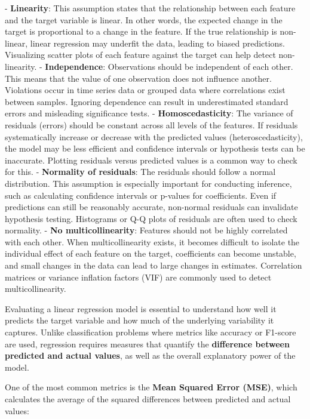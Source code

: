 - \textbf{Linearity}: This assumption states that the relationship between each feature and the target variable is linear. In other words, the expected change in the target is proportional to a change in the feature. If the true relationship is non-linear, linear regression may underfit the data, leading to biased predictions. Visualizing scatter plots of each feature against the target can help detect non-linearity. 
- \textbf{Independence}: Observations should be independent of each other. This means that the value of one observation does not influence another. Violations occur in time series data or grouped data where correlations exist between samples. Ignoring dependence can result in underestimated standard errors and misleading significance tests. 
- \textbf{Homoscedasticity}: The variance of residuals (errors) should be constant across all levels of the features. If residuals systematically increase or decrease with the predicted values (heteroscedasticity), the model may be less efficient and confidence intervals or hypothesis tests can be inaccurate. Plotting residuals versus predicted values is a common way to check for this.
- \textbf{Normality of residuals}: The residuals should follow a normal distribution. This assumption is especially important for conducting inference, such as calculating confidence intervals or p-values for coefficients. Even if predictions can still be reasonably accurate, non-normal residuals can invalidate hypothesis testing. Histograms or Q-Q plots of residuals are often used to check normality. 
- \textbf{No multicollinearity}: Features should not be highly correlated with each other. When multicollinearity exists, it becomes difficult to isolate the individual effect of each feature on the target, coefficients can become unstable, and small changes in the data can lead to large changes in estimates. Correlation matrices or variance inflation factors (VIF) are commonly used to detect multicollinearity.



Evaluating a linear regression model is essential to understand how well it predicts the target variable and how much of the underlying variability it captures. Unlike classification problems where metrics like accuracy or F1-score are used, regression requires measures that quantify the \textbf{difference between predicted and actual values}, as well as the overall explanatory power of the model.

One of the most common metrics is the \textbf{Mean Squared Error (MSE)}, which calculates the average of the squared differences between predicted and actual values:

